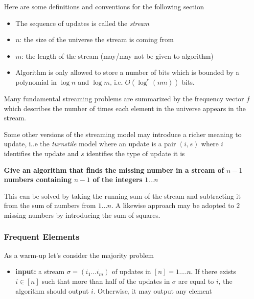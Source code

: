 \documentclass[../notes.tex]{subfiles}
\begin{document}
Here are some definitions and conventions for the following section


\begin{itemize}
    \item The sequence of updates is called the \textit{stream}
    \item $ n $: the size of the universe the stream is coming from
    \item $ m $: the length of the stream (may/may not be given to algorithm)
    \item Algorithm is only allowed to store a number of bits which is bounded by a polynomial in $ \log n $ and $ \log m $, i.e. $ O(\log^c (nm)) $ bits.
\end{itemize}

Many fundamental streaming problems are summarized by the frequency vector $ f $ which describes the number of times each element in the universe appears in the stream.

Some other versions of the streaming model may introduce a richer meaning to update, i..e the \textit{turnstile} model where an update is a pair $ (i,s) $ where $ i $ identifies the update and $ s $ identifies the type of update it is



\begin{example}
    \textbf{Give an algorithm that finds the missing number in a stream of $ n-1 $ numbers containing $ n-1 $ of the integers $ 1 \ldots n $}

    This can be solved by taking the running sum of the stream and subtracting it from the sum of numbers from $ 1 \ldots n $. 
    A likewise approach may be adopted to $ 2 $ missing numbers by introducing the sum of squares.
\end{example}



\subsubsection{Frequent Elements}

As a warm-up let's consider the majority problem

\begin{itemize}
    \item \textbf{input: } a stream $ \sigma = (i_1 \ldots i_m) $ of updates in $ [n] = {1....n} $.
        If there exists $ i \in [n] $ such that more than half of the updates in $ \sigma $ are equal to $ i $, the algorithm should output $ i $. Otherwise, it may output any element
\end{itemize}
\end{document}
